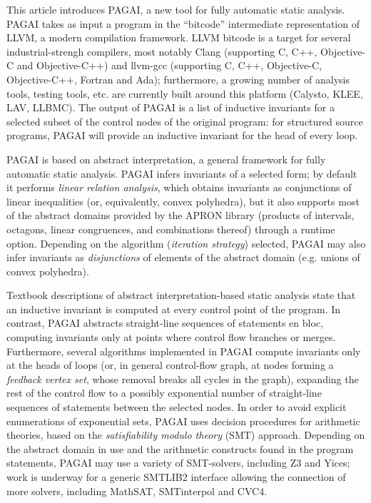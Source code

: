 \documentclass{entcs}
\begin{document}
This article introduces PAGAI, a new tool for fully automatic static analysis.
PAGAI takes as input a program in the ``bitcode'' intermediate representation of LLVM\citep{LLVM_langref,Lattner:2004:LCF:977395.977673}, a modern compilation framework.
LLVM bitcode is a target for several industrial-strengh compilers, most notably Clang (supporting C, C++, Objective-C and Objective-C++) and llvm-gcc (supporting C, C++, Objective-C, Objective-C++, Fortran and Ada);
furthermore, a growing number of analysis tools, testing tools, etc. are currently built around this platform (Calysto, KLEE, LAV, LLBMC).
The output of PAGAI is a list of inductive invariants for a selected subset of the control nodes of the original program:
for structured source programs, PAGAI will provide an inductive invariant for the head of every loop.

PAGAI is based on abstract interpretation, a general framework for fully automatic static analysis.
PAGAI infers invariants of a selected form; by default it performs \emph{linear relation analysis}, which obtains invariants as conjunctions of linear inequalities (or, equivalently, convex polyhedra), but it also supports most of the abstract domains provided by the APRON library (products of intervals, octagons, linear congruences, and combinations thereof) through a runtime option.
Depending on the algorithm (\emph{iteration strategy}) selected, PAGAI may also infer invariants as \emph{disjunctions} of elements of the abstract domain (e.g. unions of convex polyhedra).

Textbook descriptions of abstract interpretation-based static analysis state that an inductive invariant is computed at every control point of the program.
In contrast, PAGAI abstracts straight-line sequences of statements en bloc, computing invariants only at points where control flow branches or merges.
Furthermore, several algorithms implemented in PAGAI compute invariants only at the heads of loops (or, in general control-flow graph, at nodes forming a \emph{feedback vertex set}, whose removal breaks all cycles in the graph), expanding the rest of the control flow to a possibly exponential number of straight-line sequences of statements between the selected nodes.
In order to avoid explicit enumerations of exponential sets, PAGAI uses decision procedures for arithmetic theories, based on the \emph{satisfiability modulo theory} (SMT) approach.
Depending on the abstract domain in use and the arithmetic constructs found in the program statements, PAGAI may use a variety of SMT-solvers, including Z3 and Yices; work is underway for a generic SMTLIB2 interface allowing the connection of more solvers, including MathSAT, SMTinterpol and CVC4.
\end{document}
